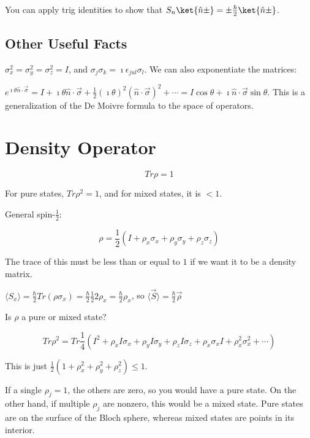 \documentclass[a4paper,twoside,master.tex]{subfiles}
\begin{document}
You can apply trig identities to show that
$S_n\ket{\hat{n}\pm} = \pm\frac{\hbar}{2}\ket{\hat{n}\pm}$.

\subsection{Other Useful Facts}
\label{sub:other_useful_facts}


$\sigma_x^2 = \sigma_y^2 = \sigma_z^2 = I$, and
$\sigma_j\sigma_k = \imath\epsilon_{jul}\sigma_l$. We can also
exponentiate the matrices:

$e^{\imath\theta\hat{n}\cdot\vec{\sigma}} = I + \imath\theta\hat{n}\cdot\vec{\sigma}+\frac{1}{2}(\imath\theta)^2(\hat{n}\cdot\vec{\sigma})^2+\cdots = I\cos\theta + \imath\hat{n}\cdot\vec{\sigma}\sin\theta$.
This is a generalization of the De Moivre formula to the space of
operators.

\section{Density Operator}
\label{sec:density_operator}

\begin{equation}
Tr\rho = 1
\end{equation}

For pure states, $Tr\rho^2 = 1$, and for mixed states, it is $<1$.

General spin-$\frac{1}{2}$:

\begin{equation}
\rho = \frac{1}{2}(I+\rho_x\sigma_x+\rho_y\sigma_y+\rho_z\sigma_z)
\end{equation}

The trace of this must be less than or equal to $1$ if we want it to
be a density matrix.

$\langle S_x\rangle = \frac{\hbar}{2}Tr(\rho\sigma_x) = \frac{\hbar}{2}\frac{1}{2}2\rho_x = \frac{\hbar}{2}\rho_x$,
so $\langle\vec{S}\rangle = \frac{\hbar}{2}\vec{\rho}$

Is $\rho$ a pure or mixed state?

\begin{equation}
Tr\rho^2 = Tr\frac{1}{4}(I^2+\rho_xI\sigma_x+\rho_yI\sigma_y+\rho_zI\sigma_z + \rho_x\sigma_xI + \rho_x^2\sigma_x^2 + \cdots)
\end{equation}

This is just $\frac{1}{2}(1+\rho_x^2+\rho_y^2+\rho_z^2)\leq 1$.

If a single $\rho_j = 1$, the others are zero, so you would have a
pure state. On the other hand, if multiple $\rho_j$ are nonzero, this
would be a mixed state. Pure states are on the surface of the Bloch
sphere, whereas mixed states are points in its interior.
\end{document}
